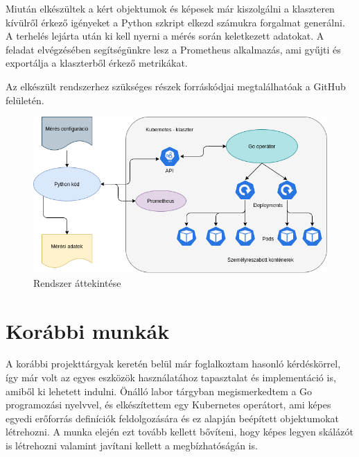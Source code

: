 
Miután elkészültek a kért objektumok és képesek már kiszolgálni a klaszteren kívülről érkező igényeket a Python szkript elkezd számukra forgalmat generálni.
A terhelés lejárta után ki kell nyerni a mérés során keletkezett adatokat.
A feladat elvégzésében segítségünkre lesz a Prometheus\citep{Prometheus} alkalmazás, ami gyűjti és exportálja a klaszterből érkező metrikákat. 

Az elkészült rendszerhez szükséges részek forráskódjai megtalálhatóak a GitHub felületén\citep{gitRepo}. 

\begin{figure}[!ht]
\centering
\includegraphics[width=150mm, keepaspectratio]{figures/system_overview.png}
\caption{Rendszer áttekintése}
\label{fig:system_overview}
\end{figure}

\section{Korábbi munkák}
A korábbi projekttárgyak keretén belül már foglalkoztam hasonló kérdéskörrel, így már volt az egyes eszközök használatához tapasztalat és implementáció is, amiből ki lehetett indulni. 
Önálló labor tárgyban megismerkedtem a Go programozási nyelvvel, és elkészítettem egy Kubernetes operátort, ami képes egyedi erőforrás definíciók feldolgozására és ez alapján beépített objektumokat létrehozni.
A munka elején ezt tovább kellett bővíteni, hogy képes legyen skálázót is létrehozni valamint javítani kellett a megbízhatóságán is.


